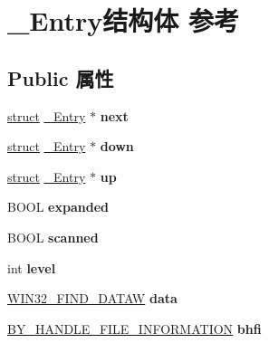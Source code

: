 \hypertarget{struct___entry}{}\section{\+\_\+\+Entry结构体 参考}
\label{struct___entry}
\subsection*{Public 属性}
\begin{DoxyCompactItemize}
\item 
\mbox{\label{struct___entry_aaa2c55f42620342dc50c940e3e4aabd6}} 
\hyperlink{interfacestruct}{struct} \hyperlink{struct___entry}{\+\_\+\+Entry} $\ast$ {\bfseries next}
\item 
\mbox{\label{struct___entry_a1c9dcf8bd3c270822ff64e780b8fb276}} 
\hyperlink{interfacestruct}{struct} \hyperlink{struct___entry}{\+\_\+\+Entry} $\ast$ {\bfseries down}
\item 
\mbox{\label{struct___entry_a237b3400f55199ab9fab8429bb23bb3d}} 
\hyperlink{interfacestruct}{struct} \hyperlink{struct___entry}{\+\_\+\+Entry} $\ast$ {\bfseries up}
\item 
\mbox{\label{struct___entry_a354ada9cbef01fe2c8752554ee3b2f15}} 
B\+O\+OL {\bfseries expanded}
\item 
\mbox{\label{struct___entry_ad1100c7333f9bd987bcb0b0464409a84}} 
B\+O\+OL {\bfseries scanned}
\item 
\mbox{\label{struct___entry_a4398a38e62455ef1e48aa4d29c252fcb}} 
int {\bfseries level}
\item 
\mbox{\label{struct___entry_ab916c1c029166b06b7b34e5ad9d697bb}} 
\hyperlink{struct_w_i_n32___f_i_n_d___d_a_t_a_a}{W\+I\+N32\+\_\+\+F\+I\+N\+D\+\_\+\+D\+A\+T\+AW} {\bfseries data}
\item 
\mbox{\label{struct___entry_a036353696a5a20b6c37008fd95d5b671}} 
\hyperlink{struct___b_y___h_a_n_d_l_e___f_i_l_e___i_n_f_o_r_m_a_t_i_o_n}{B\+Y\+\_\+\+H\+A\+N\+D\+L\+E\+\_\+\+F\+I\+L\+E\+\_\+\+I\+N\+F\+O\+R\+M\+A\+T\+I\+ON} {\bfseries bhfi}

\end{DoxyCompactItemize}
